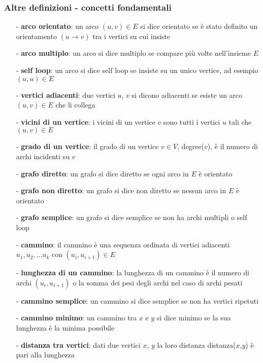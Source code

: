 \documentclass[a4paper]{article}
\begin{document}
\subsubsection*{Altre definizioni - concetti fondamentali}
\begin{itemize}[topsep=3pt, itemsep=0pt]
	\item[-] \textbf{arco orientato}: un arco \((u,v) \in E\) si dice orientato se è stato definito un orientamento \((u \to v)\)
	tra i vertici su cui insiste
	\item[-] \textbf{arco multiplo}: un arco si dice multiplo se compare più volte nell'insieme \(E\)
	\item[-] \textbf{self loop}: un arco si dice self loop se insiste su un unico vertice, ad esempio \((u,u) \in E\)
	\item[-] \textbf{vertici adiacenti}: due vertici \(u\), \(v\) si dicono adiacenti se esiste un arco \((u,v) \in E\) che li collega
	\item[-] \textbf{vicini di un vertice}: i vicini di un vertice \(v\) sono tutti i vertici \(u\) tali che \((u,v) \in E\)
	\item[-] \textbf{grado di un vertice}: il grado di un vertice \(v \in V\), degree(\(v\)), è il numero di archi incidenti su \(v\)
	\item[-] \textbf{grafo diretto}: un grafo si dice diretto se ogni arco in \(E\) è orientato
	\item[-] \textbf{grafo non diretto}: un grafo si dice non diretto se nessun arco in \(E\) è orientato
	\item[-] \textbf{grafo semplice}: un grafo si dice semplice se non ha archi multipli o self loop
	\vspace{1em}
	\item[-] \textbf{cammino}: il cammino è una sequenza ordinata di vertici adiacenti \(u_1, u_2, \dots u_k\) con \((u_i, u_{i+1}) \in E\)
	\item[-] \textbf{lunghezza di un cammino}: la lunghezza di un cammino è il numero di archi \((u_i, u_{i+1})\) o la somma dei
	pesi degli archi nel caso di archi pesati
	\item[-] \textbf{cammino semplice}: un cammino si dice semplice se non ha vertici ripetuti
	\item[-] \textbf{cammino minimo}: un cammino tra \(x\) e \(y\) si dice minimo se la sua lunghezza è la minima possibile
	\item[-] \textbf{distanza tra vertici}: dati due vertici \(x\), \(y\) la loro distanza distanza(\(x\),\(y\)) è pari alla lunghezza

\end{itemize}
\end{document}
